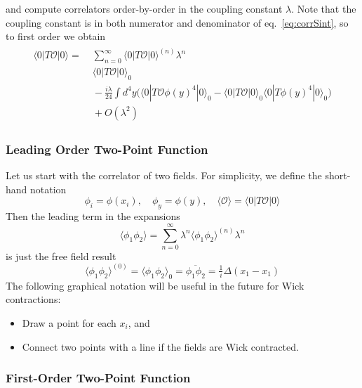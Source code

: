 \documentclass[12pt]{article}
\begin{document}
and compute correlators order-by-order in the coupling constant
$\lambda$. Note that the coupling constant is in both numerator and
denominator of eq.~\eqref{eq:corrSint}, so to first order we obtain
\begin{multline}
  \begin{split}
    \langle 0|T\mathcal{O}|0\rangle = &\;
    \sum_{n=0}^\infty \langle 0|T\mathcal{O}|0\rangle^{(n)} \lambda^n
    \\ &\;
    \langle 0|T\mathcal{O}|0\rangle_0 
    \\ &\;
    - \frac{i\lambda}{24} \int d^4y \Big(
    \langle 0|T\mathcal{O} \phi(y)^4 |0\rangle_0 - 
    \langle 0|T\mathcal{O} |0\rangle_0 
    \langle 0|T \phi(y)^4 |0\rangle_0 
    \Big)
    \\ &\;
    + O(\lambda^2)
  \end{split}
\end{multline}


\subsubsection{Leading Order Two-Point Function}

Let us start with the correlator of two fields. For simplicity, we
define the short-hand notation
\begin{equation}
  \phi_i = \phi(x_i)
  ,\quad
  \phi_y = \phi(y)
  ,\quad
  \langle \mathcal{O} \rangle = \langle 0|T \mathcal{O} |0\rangle
\end{equation}
Then the leading term in the expansions
\begin{equation}
  \langle \phi_1 \phi_2 \rangle = 
  \sum_{n=0}^\infty \lambda^n \langle \phi_1 \phi_2 \rangle^{(n)}
  \lambda^n
\end{equation}
is just the free field result
\begin{equation}
  \langle \phi_1 \phi_2 \rangle^{(0)}
  = 
  \langle \phi_1 \phi_2 \rangle_0
  = 
  \overline{\phi_1 \phi_2}
  = 
  \tfrac{1}{i} \Delta(x_1 - x_1)
\end{equation}
The following graphical notation will be useful in the future for Wick
contractions:
\begin{itemize}
\item Draw a point for each $x_i$, and
\item Connect two points with a line if the fields are Wick contracted.
\end{itemize}


\subsubsection{First-Order Two-Point Function}
\end{document}
